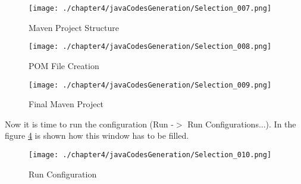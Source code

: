\begin{figure}
\centering
{\texttt{[image: ./chapter4/javaCodesGeneration/Selection\_007.png]}}
\caption{Maven Project Structure}
\label{fig:Maven Project Structure}
\end{figure}

\begin{figure}
\centering
{\texttt{[image: ./chapter4/javaCodesGeneration/Selection\_008.png]}}
\caption{POM File Creation}
\label{fig:POM File Creation}
\end{figure}

\begin{figure}
\centering
{\texttt{[image: ./chapter4/javaCodesGeneration/Selection\_009.png]}}
\caption{Final Maven Project}
\label{fig:Final Maven Project}
\end{figure}

Now it is time to run the configuration (Run -$>$ Run Configurations...). In the figure \ref{fig:Run Configuration} is shown how this window has to be filled.

\begin{figure}
\centering
{\texttt{[image: ./chapter4/javaCodesGeneration/Selection\_010.png]}}
\caption{Run Configuration}
\label{fig:Run Configuration}
\end{figure}











